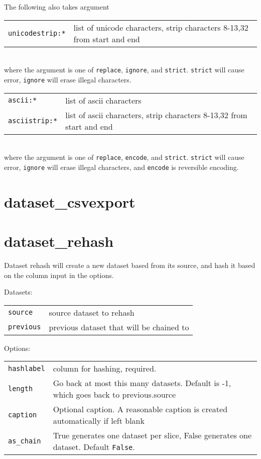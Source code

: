 \noindent The following also takes argument\\

\begin{tabular}{ll}
  \texttt{unicodestrip:*}  & list of unicode characters, strip characters 8-13,32 from start and end\\
\end{tabular}\\

\noindent where the argument is one of \texttt{replace}, \texttt{ignore}, and \texttt{strict}.
\texttt{strict} will cause error, \texttt{ignore} will erase illegal characters.\\

\begin{tabular}{ll}
  \texttt{ascii:*}      & list of ascii characters\\
  \texttt{asciistrip:*} & list of ascii characters, strip characters 8-13,32 from start and end\\
\end{tabular}\\

\noindent where the argument is one of \texttt{replace}, \texttt{encode}, and \texttt{strict}.
\texttt{strict} will cause error, \texttt{ignore} will erase illegal characters,
and \texttt{encode} is reversible encoding.


\clearpage
\section{dataset\_csvexport}

\clearpage
\section{dataset\_rehash}



Dataset rehash will create a new dataset based from its source, and
hash it based on the column input in the options.

\noindent Datasets:

\begin{tabular}{ll}
  \texttt{source}   & source dataset to rehash\\
  \texttt{previous} & previous dataset that will be chained to\\
\end{tabular}

\noindent Options:

\begin{tabular}{ll}
  \texttt{hashlabel} & column for hashing, required.\\
  \texttt{length}    & Go back at most this many datasets. Default is -1, which goes back to previous.source\\
  \texttt{caption}   & Optional caption.  A reasonable caption is created automatically if left blank\\
  \texttt{as\_chain}  & True generates one dataset per slice, False generates one dataset.  Default \texttt{False}.\\
\end{tabular}

